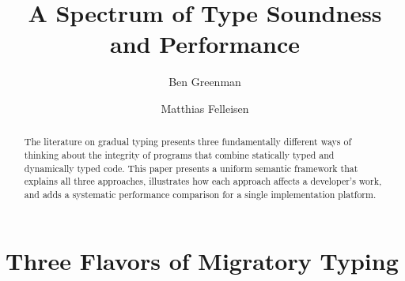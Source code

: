 \documentclass[screen=true, 10pt, acmsmall]{acmart}
\newcommand{\sectionNewpage}{}
\newcommand{\preDoc}{}
\let\SOriginalthesubsection\thesubsection
\newcommand{\Ssection}[2]{\section[#1]{#2}\let\thesubsection\SOriginalthesubsection}
\begin{document}
\preDoc



\begin{abstract}The literature on gradual typing presents three fundamentally
different ways of thinking about the integrity of programs that combine
statically typed and dynamically typed code.
This paper presents a uniform semantic framework that explains all three approaches,
 illustrates how each approach affects a developer{'}s work, and
 adds a systematic performance comparison for a single implementation platform.\end{abstract}

\title{A Spectrum of Type Soundness and Performance}
\author{Ben Greenman}
\author{Matthias Felleisen}
\maketitle
\label{t:x28part_x22Ax5fSpectrumx5fofx5fTypex5fSoundnessx5fandx5fPerformancex22x29}









\sectionNewpage

\Ssection{Three Flavors of Migratory Typing}{Three Flavors of Migratory Typing}\label{t:x28part_x22secx3aintroductionx22x29}
\end{document}
